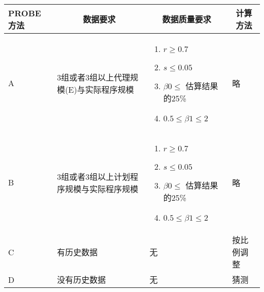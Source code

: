 \vspace{-0.5em}
\begin{spacing}{1.2}
    \centering
    \begin{longtable}{|m{2.3cm}<{\centering}|m{3cm}|m{4cm}|m{2.3cm}<{\centering}|}
        \hline
        \textbf{PROBE方法} & \multicolumn{1}{c|}{\textbf{数据要求}} & \multicolumn{1}{c|}{\textbf{数据质量要求}}                                                 & \multicolumn{1}{c|}{\textbf{计算方法}} \\ \hline
        A & 3组或者3组以上代理规模(E)与实际程序规模 &
        \vspace{-1em}
        \begin{enumerate}[label=\arabic*.,leftmargin=1.2em,itemsep=-2pt]
            \item $r\geq 0.7$
            \item $s\leq 0.05$
            \item $\beta 0 \leq$ 估算结果的25\%
            \item $0.5\leq \beta 1 \leq 2$    
        \vspace{-1.3em}
        \end{enumerate}
        & 略 \\ \hline
        B & 3组或者3组以上计划程序规模与实际程序规模 &
        \vspace{-1em}
        \begin{enumerate}[label=\arabic*.,leftmargin=1.2em,itemsep=-2pt]
            \item $r\geq 0.7$
            \item $s\leq 0.05$
            \item $\beta 0 \leq$ 估算结果的25\%
            \item $0.5\leq \beta 1 \leq 2$    
        \vspace{-1.3em}
        \end{enumerate}
        & 略 \\ \hline
        C & 有历史数据 & 无 & 按比例调整 \\ \hline
        D & 没有历史数据 & 无 & 猜测 \\ \hline
    \end{longtable}
	\end{spacing}
\vspace{-1em}